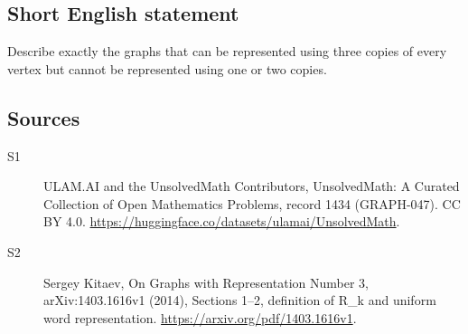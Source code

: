 \documentclass[11pt]{article}
\begin{document}
\subsection{Short English statement}
Describe exactly the graphs that can be represented using three copies of every vertex but cannot be represented using one or two copies.
\subsection{Sources}
\begin{description}
\item[\hypertarget{source:1434:1}{S1}] ULAM.AI and the UnsolvedMath Contributors, UnsolvedMath: A Curated Collection of Open Mathematics Problems, record 1434 (GRAPH-047). CC BY 4.0. \url{https://huggingface.co/datasets/ulamai/UnsolvedMath}.
\item[\hypertarget{source:1434:2}{S2}] Sergey Kitaev, On Graphs with Representation Number 3, arXiv:1403.1616v1 (2014), Sections 1--2, definition of R\_k and uniform word representation. \url{https://arxiv.org/pdf/1403.1616v1}.
\end{description}
\label{end:1434}
\end{document}
